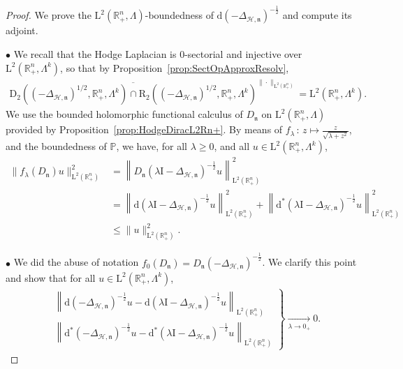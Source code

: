 \documentclass[10pt]{amsart}
\theoremstyle{definition}\newtheorem{defi}[theo]{Definition}\newtheorem{rema}[theo]{Remark}\newtheorem{exam}[theo]{Example}\newtheorem{exem}[theo]{Example}\newtheorem{nota}[theo]{Notation}
\newcommand{\bbP}{\mathbb{P}}
\newcommand{\bbR}{\mathbb{R}}
\newcommand{\rmd}{\mathrm{d}}
\newcommand{\rmD}{\mathrm{D}}
\newcommand{\rmL}{\mathrm{L}}
\newcommand{\rmR}{\mathrm{R}}
\newcommand{\rmI}{\mathrm{I}}
\newcommand{\clH}{\mathcal{H}}
\newcommand{\fkn}{\mathfrak{n}}
\begin{document}
\begin{proof}
We prove the $\rmL^2(\bbR^n_+,\Lambda)$-boundedness of $\rmd(-\Delta_{\clH,\fkn})^{-\frac{1}{2}}$ and compute its adjoint.

$\bullet$ We recall that the Hodge Laplacian is $0$-sectorial and injective over $\rmL^2(\bbR^n_+,\Lambda^k)$, so that by Proposition~\ref{prop:SectOpApproxResolv},
\begin{align*}
\overline{\rmD_2\left(\left(-\Delta_{\clH,\fkn}\right)^{1/2},\bbR^n_+,\Lambda^k\right)\cap\rmR _2\left(\left(-\Delta_{\clH,\fkn}\right)^{1/2},\bbR^n_+,\Lambda^k\right)}^{\| \cdot \|_{\rmL^2\left(\bbR^n_+\right)}} = \rmL^2\left(\bbR^n_+,\Lambda^k\right).
\end{align*}
We use the bounded holomorphic functional calculus of $D_\fkn$ on $\rmL^2(\bbR^n_+,\Lambda)$ provided by Proposition~\ref{prop:HodgeDiracL2Rn+}. By means of $f_\lambda\,:\,z\mapsto \frac{z}{\sqrt{\lambda +z^2}}$, and the boundedness of $\bbP$, we have, for all $\lambda\geqslant0$, and all $u\in\rmL^2(\bbR^n_+,\Lambda^k)$,
\begin{align*}
\| f_\lambda(D_{\fkn})u\|_{\rmL^2\left(\bbR^n_+\right)}^2
&=\left\| D_{\fkn} (\lambda\rmI -\Delta_{\clH,\fkn})^{-\frac{1}{2}}u\right\|_{\rmL^2\left(\bbR^n_+\right)}^2\\
&=\left\| \rmd(\lambda\rmI -\Delta_{\clH,\fkn})^{-\frac{1}{2}} u \right\|_{\rmL^2\left(\bbR^n_+\right)}^2+\left\| \rmd^\ast\left(\lambda\rmI -\Delta_{\clH,\fkn}\right)^{-\frac{1}{2}} u \right\|_{\rmL^2\left(\bbR^n_+\right)}^2\\ &\leqslant \| u \|_{\rmL^2\left(\bbR^n_+\right)}^2 .
\end{align*}

$\bullet$ We did the abuse of notation $f_0(D_{\fkn})=D_{\fkn}(-\Delta_{\clH,\fkn})^{-\frac{1}{2}}$. We clarify this point and show that for all $u\in\rmL^2(\bbR^n_+,\Lambda^k)$,
\begin{align*}
\left.
\begin{array}{ll}
&\left\| \rmd\left(-\Delta_{\clH,\fkn}\right)^{-\frac{1}{2}} u - \rmd\left(\lambda\rmI -\Delta_{\clH,\fkn}\right)^{-\frac{1}{2}} u\right\|_{\rmL^2\left(\bbR^n_+\right)} \\ 
&\left\| \rmd^\ast\left(-\Delta_{\clH,\fkn}\right)^{-\frac{1}{2}} u - \rmd^\ast\left(\lambda\rmI -\Delta_{\clH,\fkn}\right)^{-\frac{1}{2}} u\right\|_{\rmL^2\left(\bbR^n_+\right)}
\end{array}
\right\}
\xrightarrow[\lambda \rightarrow 0_+]{}0.
\end{align*}


\end{proof}
\end{document}

